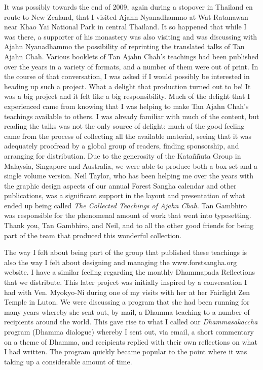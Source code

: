 It was possibly towards the end of 2009, again during a stopover in
Thailand en route to New Zealand, that I visited Ajahn Nyanadhammo at
Wat Ratanawan near Khao Yai National Park\cite{khao} in central Thailand.
It so happened that
while I was there, a supporter of his monastery was also visiting and was
discussing with Ajahn Nyanadhammo the possibility of reprinting the
translated talks of Tan Ajahn Chah. Various booklets of Tan Ajahn Chah's
teachings had been published over the years in a variety of formats, and
a number of them were out of print. In the course of that conversation,
I was asked if I would possibly be interested in heading up such a
project. What a delight that production turned out to be! It was a big
project and it felt like a big responsibility. Much of the delight that
I experienced came from knowing that I was helping to make Tan Ajahn
Chah's teachings available to others. I was already familiar with much
of the content, but reading the talks was not the only source of
delight: much of the good feeling came from the process of collecting
all the available material, seeing that it was adequately proofread by a
global group of readers, finding sponsorship, and arranging for
distribution. Due to the generosity of the Kataññuta Group in Malaysia,
Singapore and Australia, we were able to produce both a box set and a
single volume version. Neil Taylor, who has been helping me over the
years with the graphic design aspects of our annual Forest Sangha
calendar and other publications, was a significant support in the layout
and presentation of what ended up being called
\emph{The Collected Teachings of Ajahn Chah}\cite{collected}.
Tan Gambhiro was responsible for the phenomenal amount of work that went into
typesetting. Thank you, Tan Gambhiro, and Neil, and to all the other
good friends for being part of the team that produced this wonderful
collection.

The way I felt about being part of the group that published these
teachings is also the way I felt about designing and managing the
www.forstsangha.org website. I have a similar feeling regarding the monthly
Dhammapada Reflections\cite{reflections} that we distribute. This later project was
initially inspired by a conversation I had with Ven. Myokyo-Ni during
one of my visits with her at her Fairlight Zen Temple\cite{fairlight}
in Luton. We were discussing a program
that she had been running for many years whereby she sent out, by mail,
a Dhamma teaching to a number of recipients around the world. This gave
rise to what I called our \emph{Dhammasakaccha} program (Dhamma
dialogue) whereby I sent out, via email, a short commentary on a theme
of Dhamma, and recipients replied with their own reflections on what I
had written. The program quickly became popular to the point where it
was taking up a considerable amount of time.

